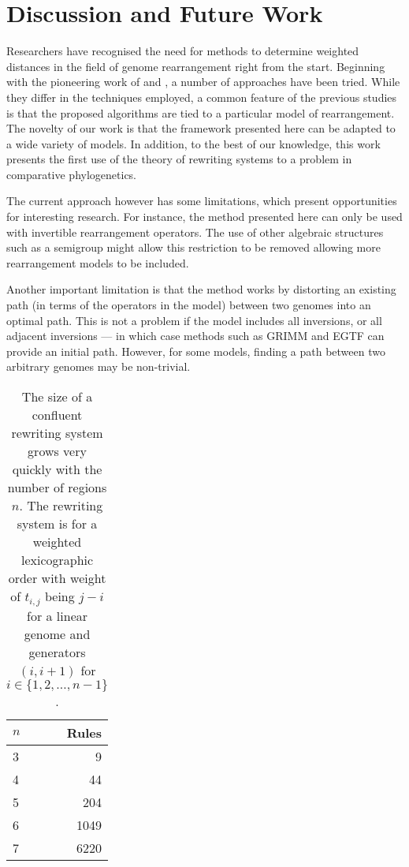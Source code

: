 \documentclass[12pt,a4paper]{amsart}
\numberwithin{equation}{section}
\begin{document}
\section{Discussion and Future Work}
\label{sec:future}
Researchers have recognised the need for methods to determine weighted distances in the field of genome rearrangement right from the start. Beginning with the pioneering work of \citet{sankoff1992edit} and \citet{sankoff1992gene}, a number of approaches have been tried. While they differ in the techniques employed, a common feature of the previous studies is that the proposed algorithms are  tied to a particular model of rearrangement. The novelty of our work is that the framework presented here can be adapted to a wide variety of models. In addition, to the best of our knowledge, this work presents the first use of the theory of rewriting systems to a problem in comparative phylogenetics. 

The current approach however has some limitations, which present opportunities for interesting research.  For instance, the method presented here can only be used  with invertible rearrangement operators. The use of other algebraic structures such as a semigroup might allow this restriction to be removed allowing more rearrangement models to be included.

Another important limitation is that the method works by distorting an existing path (in terms of the operators in the model) between two genomes into an optimal path.  This is not a problem if the model includes all inversions, or all adjacent inversions --- in which case methods such as GRIMM and EGTF can provide an initial path. 
However, for some models, finding a path between two arbitrary genomes may be non-trivial. 

\begin{table}[h!]
  \centering
  \begin{tabular}{lr}
  \toprule
  $n$ &   Rules \\
  \midrule
  3 & 9 \\
  4 & 44  \\
  5 & 204 \\
  6 & 1049 \\
  7 & 6220 \\
  \end{tabular}
  \caption[Number of rewriting rules]{The size of a confluent rewriting system grows very quickly with the number of regions $n$. The rewriting system is for a weighted lexicographic order with weight of $t_{i,j}$ being $j-i$ for a linear genome and generators $(i, i + 1)$ for $i \in \{1, 2, \dots, n - 1\}$. }\label{table:numrules}
\end{table}
\end{document}
